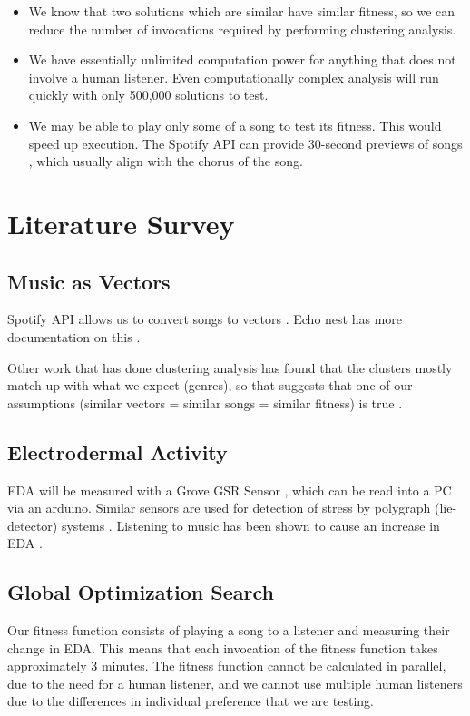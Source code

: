 \documentclass{article}
\begin{document}
	\begin{itemize}
		\item We know that two solutions which are similar have similar fitness, so we can reduce the number of invocations required by performing clustering analysis.
		\item We have essentially unlimited computation power for anything that does not involve a human listener. Even computationally complex analysis will run quickly with only 500,000 solutions to test.
		\item We may be able to play only some of a song to test its fitness. This would speed up execution. The Spotify API can provide 30-second previews of songs \cite{spotify_get_nodate-1}, which usually align with the chorus of the song.
	\end{itemize}

	\section{Literature Survey}
	
	\subsection{Music as Vectors}
	Spotify API allows us to convert songs to vectors \cite{spotify_get_nodate}. Echo nest has more documentation on this \cite{jehan_analyzer_nodate}.
	
	Other work that has done clustering analysis has found that the clusters mostly match up with what we expect (genres), so that suggests that one of our assumptions (similar vectors = similar songs = similar fitness) is true \cite{santos_discovering_2017, rcharlie_analytics_coachellar_2017}.
	
	\subsection{Electrodermal Activity}
	EDA will be measured with a Grove GSR Sensor \cite{seeedstudio_grove_nodate}, which can be read into a PC via an arduino. Similar sensors are used for detection of stress by polygraph (lie-detector) systems \cite{tuckett_detection_1986}. Listening to music has been shown to cause an increase in EDA \cite{rickard_intense_2004, dillman-capentier_effects_2007, thoma_effect_2013}.
	
	\subsection{Global Optimization Search}
	Our fitness function consists of playing a song to a listener and measuring their change in EDA. This means that each invocation of the fitness function takes approximately 3 minutes. The fitness function cannot be calculated in parallel, due to the need for a human listener, and we cannot use multiple human listeners due to the differences in individual preference that we are testing.
	
\end{document}
